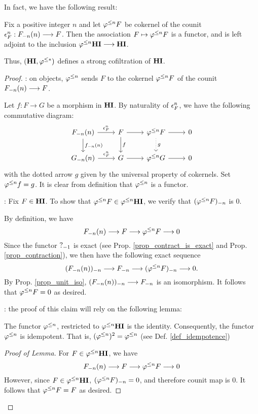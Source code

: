 In fact, we have the following result:

\begin{prop}\label{prop_HI_lower_slice}
Fix a positive integer $n$ and let $\tlHI{n}F$ be cokernel of the 
counit $\cuHI^n_F: \LHI[n]{\RHI[n]{F}} \to F$. Then the 
association $F \mapsto \tlHI{n}F$ is a functor, and is left 
adjoint to the inclusion $\tlHI{n}\HI \to \HI$.

Thus, $(\HI, \tlHI{*})$ defines a strong cofiltration
of $\HI$.
\end{prop}
\begin{proof}
 : on objects, $\tlHI{n}$ sends $F$ to the 
cokernel $\tlHI{n}F$ of the counit $\LHI[n]{\RHI[n]{F}} \to F$.

Let $f: F \to G$ be a morphism in $\HI$.
By naturality of $\cuHI^n_F$, we have the following commutative
diagram:
\[
\begin{tikzcd}
\LHI[n]{\RHI[n]{F}} \arrow{r}{\cuHI_F^n} \arrow{d}{\LHI[n]{\RHI[n]{f}}}
& F \arrow{r} \arrow{d}{f}
& \tlHI{n} F \arrow[dotted]{d}{g} \arrow{r}
& 0 \\
\LHI[n]{\RHI[n]{G}} \arrow{r}{\cuHI_F^n}
& G \arrow{r}
& \tlHI{n}G \arrow{r}
& 0
\end{tikzcd}
\]
with the dotted arrow $g$ given by the universal property of 
cokernels. Set $\tlHI{n}f = g$. It is clear from definition that
$\tlHI{n}$ is a functor.

 : Fix $F \in \HI$. To
show that $\tlHI{n}F \in \tlHI{n}\HI$, we verify that 
$\RHI[n]{(\tlHI{n}F)}$ is 0.

By definition, we have
\[
\LHI[n]{\RHI[n]{F}} \to F \to \tlHI{n}F \to 0
\]
Since the functor $\RHI{?}$ is exact (see Prop. 
\ref{prop_contract_is_exact} and Prop. \ref{prop_contraction}), 
we then have the following exact sequence
\[
\RHI[n]{(\LHI[n]{\RHI[n]{F}})} \to \RHI[n]{F} \to
\RHI[n]{(\tlHI{n}F)} \to 0.
\]
By Prop. \ref{prop_unit_iso}, $\RHI[n]{(\LHI[n]{\RHI[n]{F}})}
\to \RHI[n]{F}$ is an isomorphism. It follows that $\tlHI{n}F = 
0$ as desired.

 : the proof
of this claim will rely on the following lemma:

\begin{lem}\label{lem_tlHI_id}
The functor $\tlHI{n}$, restricted to $\tlHI{n}\HI$ is the 
identity. Consequently, the functor $\tlHI{n}$ is idempotent. 
That is, $(\tlHI{n})^2 = \tlHI{n}$ (see Def. \ref{def_idempotence})
\end{lem}
\begin{proof}[Proof of Lemma]
For $F \in \tlHI{n}\HI$, we have
\[
\LHI[n]{\RHI[n]{F}} \to F \to \tlHI{n}F \to 0
\]
However, since $F \in \tlHI{n}\HI$, $\RHI[n]{(\tlHI{n}F)} = 0$, and 
therefore counit map is $0$. It follows that $\tlHI{n}F = F$ as 
desired.


\end{proof}
\end{proof}

